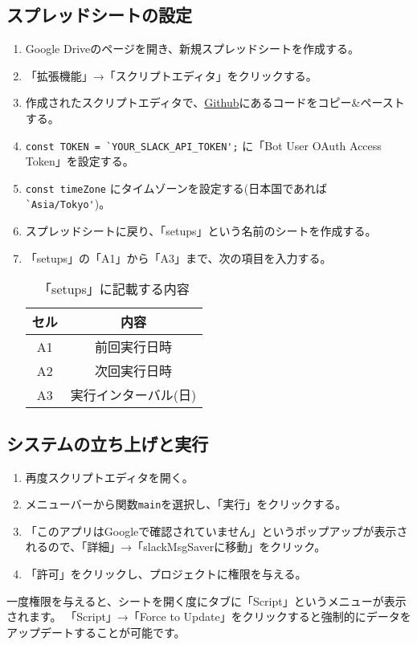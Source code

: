 \documentclass[a4j, 11pt, dvipdfmx]{jsarticle}
\begin{document}
\subsection{スプレッドシートの設定}
\begin{enumerate}
\item Google Driveのページを開き、新規スプレッドシートを作成する。
\item 「拡張機能」→「スクリプトエディタ」をクリックする。
\item 作成されたスクリプトエディタで、\href{https://github.com/RjChiba/slackMsgSaver/blob/main/main.js}{Github}にあるコードをコピー\&ペーストする。
\item \verb|const TOKEN = `YOUR_SLACK_API_TOKEN';| に「Bot User OAuth Access Token」を設定する。
\item \verb|const timeZone| にタイムゾーンを設定する(日本国であれば\verb|`Asia/Tokyo'|)。
\item スプレッドシートに戻り、「setups」という名前のシートを作成する。
\item 「setups」の「A1」から「A3」まで、次の項目を入力する。

\begin{table}[htp]
\caption{「setups」に記載する内容}
\begin{center}
\begin{tabular}{|c|c|}
\hline
セル & 内容\\
\hline
A1 & 前回実行日時\\
A2 & 次回実行日時\\
A3 & 実行インターバル(日)\\
\hline
\end{tabular}
\end{center}
\end{table}%
\end{enumerate}

\subsection{システムの立ち上げと実行}
\begin{enumerate}
\item 再度スクリプトエディタを開く。
\item メニューバーから関数\verb|main|を選択し、「実行」をクリックする。
\item 「このアプリはGoogleで確認されていません」というポップアップが表示されるので、「詳細」→「slackMsgSaverに移動」をクリック。
\item 「許可」をクリックし、プロジェクトに権限を与える。
\end{enumerate}

一度権限を与えると、シートを開く度にタブに「Script」というメニューが表示されます。
「Script」→「Force to Update」をクリックすると強制的にデータをアップデートすることが可能です。
\end{document}
